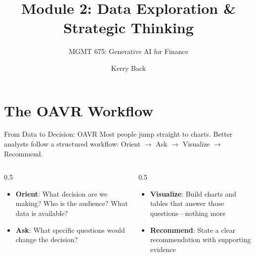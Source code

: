 \documentclass[aspectratio=169]{beamer}
\subtitle{MGMT 675: Generative AI for Finance}
\title{Module 2: Data Exploration \& Strategic Thinking}
\author{Kerry Back}
\date{}
\begin{document}
\maketitle

\section{The OAVR Workflow}

\begin{frame}{From Data to Decision: OAVR}
Most people jump straight to charts.  Better analysts follow a structured workflow: \alert{Orient $\rightarrow$ Ask $\rightarrow$ Visualize $\rightarrow$ Recommend}.
\vspace{0.3cm}
\begin{center}
\end{center}
\vspace{0.3cm}
\begin{columns}[T]
\begin{column}{0.5\textwidth}
\begin{itemize}\small
  \item \textbf{Orient}: What decision are we making? Who is the audience? What data is available?
  \item \textbf{Ask}: What specific questions would change the decision?
\end{itemize}
\end{column}
\begin{column}{0.5\textwidth}
\begin{itemize}\small
  \item \textbf{Visualize}: Build charts and tables that answer those questions---nothing more
  \item \textbf{Recommend}: State a clear recommendation with supporting evidence
\end{itemize}
\end{column}
\end{columns}
\end{frame}
\end{document}
